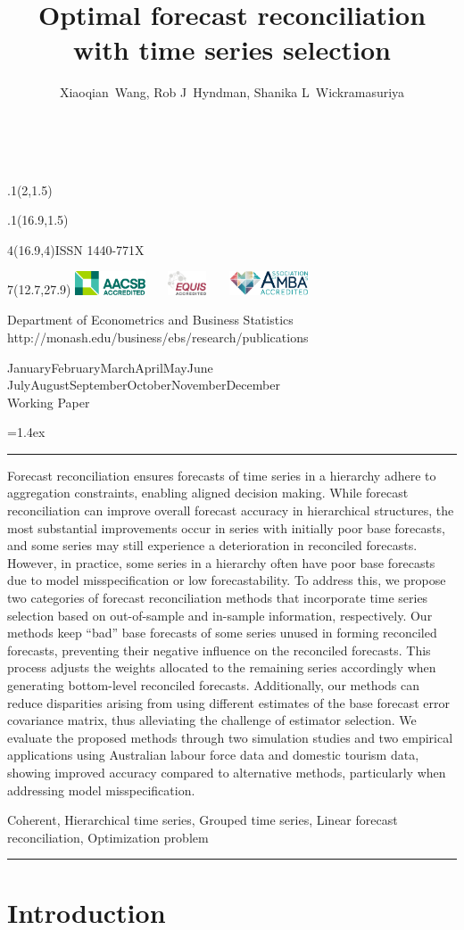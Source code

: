 \documentclass[11pt,a4paper,]{article}
\title{Optimal forecast reconciliation with time series selection}
\author{Xiaoqian~Wang, Rob J~Hyndman, Shanika L~Wickramasuriya}
\date{\sf\Date~\Month~\Year}
\makeatletter
\def\Date{\number\day}
\def\Month{\ifcase\month\or
 January\or February\or March\or April\or May\or June\or
 July\or August\or September\or October\or November\or December\fi}
\def\Year{\number\year}
\def\showjel{{\large\textsf{\textbf{JEL classification:}}~\@jel}}
\def\cover{{\sffamily\setcounter{page}{0}
        \thispagestyle{empty}
        \placefig{2}{1.5}{width=5cm}{_extensions/wp/monash2}
        \placefig{16.9}{1.5}{width=2.1cm}{_extensions/wp/MBSportrait}
        \begin{textblock}{4}(16.9,4)ISSN 1440-771X\end{textblock}
        \begin{textblock}{7}(12.7,27.9)\hfill
        \includegraphics[height=0.7cm]{_extensions/wp/AACSB}~~~
        \includegraphics[height=0.7cm]{_extensions/wp/EQUIS}~~~
        \includegraphics[height=0.7cm]{_extensions/wp/AMBA}
        \end{textblock}
        \vspace*{2cm}
        \begin{center}\Large
        Department of Econometrics and Business Statistics\\[.5cm]
        \footnotesize http://monash.edu/business/ebs/research/publications
        \end{center}\vspace{2cm}
        \begin{center}
        \fbox{\parbox{14cm}{\begin{onehalfspace}\centering\Huge\vspace*{0.3cm}
                \textsf{\textbf{\expandafter{\@title}}}\vspace{1cm}\par
                \LARGE\@author\end{onehalfspace}
        }}
        \end{center}
        \vfill
                \begin{center}\Large
                \Month~\Year\\[1cm]
                Working Paper \@wp
        \end{center}\vspace*{2cm}}}
\def\pageone{{\sffamily\setstretch{1}%
        \thispagestyle{empty}%
        \vbox to \textheight{%
        \raggedright\baselineskip=1.2cm
     {\fontsize{24.88}{30}\sffamily\textbf{\expandafter{\@title}}}
        \vspace{2cm}\par
        \hspace{1cm}\parbox{14cm}{\sffamily\large\@addresses}\vspace{1cm}\vfill
        \hspace{1cm}{\large\Date~\Month~\Year}\\[1cm]
        \hspace{1cm}\showjel\vss}}}
\def\blindtitle{{\sffamily
     \thispagestyle{plain}\raggedright\baselineskip=1.2cm
     {\fontsize{24.88}{30}\sffamily\textbf{\expandafter{\@title}}}\vspace{1cm}\par
        }}
\def\titlepage{{\cover\newpage\pageone\newpage\blindtitle}}
\let\maketitle\titlepage
\newenvironment{keywords}{\par\vspace{0.5cm}\noindent{\sffamily\textbf{Keywords:}}}{\vspace{0.25cm}\par\hrule\vspace{0.5cm}\par}
\renewenvironment{abstract}{\begin{minipage}{\textwidth}\parskip=1.4ex\noindent
\hrule\vspace{0.1cm}\par{\sffamily\textbf{\abstractname}}\newline}
  {\end{minipage}}
\def\placefig#1#2#3#4{\begin{textblock}{.1}(#1,#2)\rlap{\texttt{[image: \#4]}}\end{textblock}}
\makeatother
\begin{document}
\maketitle
\begin{abstract}
Forecast reconciliation ensures forecasts of time series in a hierarchy
adhere to aggregation constraints, enabling aligned decision making.
While forecast reconciliation can improve overall forecast accuracy in
hierarchical structures, the most substantial improvements occur in
series with initially poor base forecasts, and some series may still
experience a deterioration in reconciled forecasts. However, in
practice, some series in a hierarchy often have poor base forecasts due
to model misspecification or low forecastability. To address this, we
propose two categories of forecast reconciliation methods that
incorporate time series selection based on out-of-sample and in-sample
information, respectively. Our methods keep ``bad'' base forecasts of
some series unused in forming reconciled forecasts, preventing their
negative influence on the reconciled forecasts. This process adjusts the
weights allocated to the remaining series accordingly when generating
bottom-level reconciled forecasts. Additionally, our methods can reduce
disparities arising from using different estimates of the base forecast
error covariance matrix, thus alleviating the challenge of estimator
selection. We evaluate the proposed methods through two simulation
studies and two empirical applications using Australian labour force
data and domestic tourism data, showing improved accuracy compared to
alternative methods, particularly when addressing model
misspecification.
\end{abstract}
\begin{keywords}
Coherent, Hierarchical time series, Grouped time series, Linear forecast
reconciliation, Optimization problem
\end{keywords}

\ifdefined\Shaded\renewenvironment{Shaded}{\begin{tcolorbox}[interior hidden, enhanced, breakable, borderline west={3pt}{0pt}{shadecolor}, sharp corners, frame hidden, boxrule=0pt]}{\end{tcolorbox}}\fi

\hypertarget{sec-introduction}{%
\section{Introduction}\label{sec-introduction}}
\end{document}
